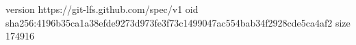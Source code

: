 version https://git-lfs.github.com/spec/v1
oid sha256:4196b35ca1a38efde9273d973fe3f73c1499047ac554bab34f2928cde5ca4af2
size 174916
